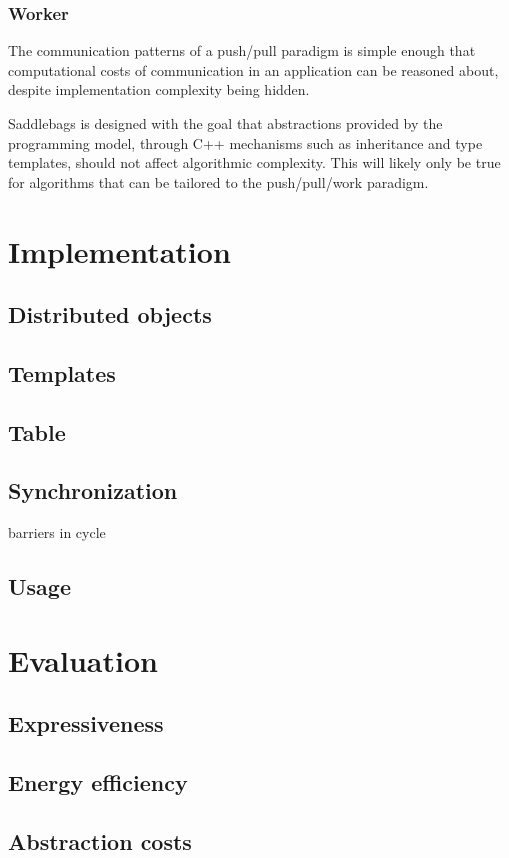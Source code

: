 \documentclass{uit-report}
\begin{document}
\subsubsection{Worker}


The communication patterns of a push/pull paradigm is simple enough that computational costs of communication in an application can be reasoned about, despite implementation complexity being hidden. 

Saddlebags is designed with the goal that abstractions provided by the programming model, through C++ mechanisms such as inheritance and type templates, should not affect algorithmic complexity. This will likely only be true for algorithms that can be tailored to the push/pull/work paradigm. 


\newpage
\section{Implementation}
\subsection{Distributed objects}
\subsection{Templates}
\subsection{Table}
\subsection{Synchronization}
barriers in cycle
\subsection{Usage}

\newpage
\section{Evaluation}
\subsection{Expressiveness}
\subsection{Energy efficiency}
\subsection{Abstraction costs}
\end{document}
